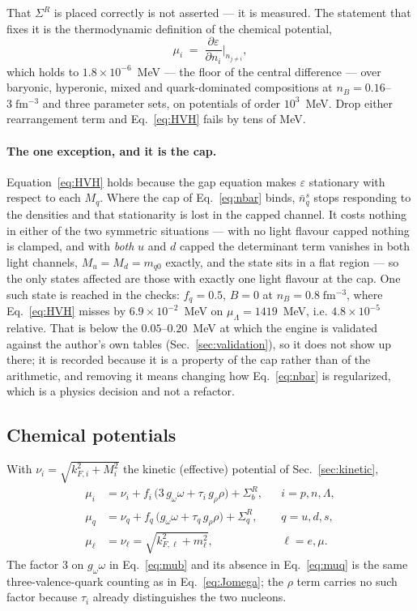 \documentclass[aps,prc,onecolumn,superscriptaddress,nofootinbib,10pt]{revtex4-2}
\newcommand{\nB}{n_B}
\newcommand{\nbs}{\bar{n}^s}
\newcommand{\SR}{\Sigma^{R}}
\begin{document}
That $\SR$ is placed correctly is not asserted --- it is measured. The
statement that fixes it is the thermodynamic definition of the chemical
potential,
%
\begin{equation}
\mu_i \;=\; \frac{\partial \varepsilon}{\partial n_i}
   \bigg|_{n_{j \ne i}} ,
\label{eq:HVH}
\end{equation}
%
which holds to $1.8\times10^{-6}$~MeV --- the floor of the central difference
--- over baryonic, hyperonic, mixed and quark-dominated compositions at
$\nB = 0.16$--$3\;\mathrm{fm^{-3}}$ and three parameter sets, on potentials of
order $10^3$~MeV. Drop either rearrangement term and Eq.~\eqref{eq:HVH} fails
by tens of MeV.

\paragraph{The one exception, and it is the cap.} Equation~\eqref{eq:HVH}
holds because the gap equation makes $\varepsilon$ stationary with respect to
each $M_q$. Where the cap of Eq.~\eqref{eq:nbar} binds, $\nbs_q$ stops
responding to the densities and that stationarity is lost in the capped
channel. It costs nothing in either of the two symmetric situations --- with
no light flavour capped nothing is clamped, and with \emph{both} $u$ and $d$
capped the determinant term vanishes in both light channels, $M_u = M_d =
m_{q0}$ exactly, and the state sits in a flat region --- so the only states
affected are those with exactly one light flavour at the cap. One such state
is reached in the checks: $f_q = 0.5$, $B = 0$ at
$\nB = 0.8\;\mathrm{fm^{-3}}$, where Eq.~\eqref{eq:HVH} misses by
$6.9\times10^{-2}$~MeV on $\mu_\Lambda = 1419$~MeV, i.e. $4.8\times10^{-5}$
relative. That is below the $0.05$--$0.20$~MeV at which the engine is
validated against the author's own tables
(Sec.~\ref{sec:validation}), so it does not show up there; it is recorded
because it is a property of the cap rather than of the arithmetic, and
removing it means changing how Eq.~\eqref{eq:nbar} is regularized, which is a
physics decision and not a refactor.

\subsection{Chemical potentials}

With $\nu_i = \sqrt{k_{F,i}^2 + M_i^2}$ the kinetic (effective) potential of
Sec.~\ref{sec:kinetic},
%
\begin{align}
\mu_i &= \nu_i + f_i\,\big(3\, g_\omega\omega + \tau_i\, g_\rho\rho\big)
         + \SR_b , &&i = p, n, \Lambda ,
\label{eq:mub}\\
\mu_q &= \nu_q + f_q\,\big(g_\omega\omega + \tau_q\, g_\rho\rho\big)
         + \SR_q , &&q = u, d, s ,
\label{eq:muq}\\
\mu_\ell &= \nu_\ell = \sqrt{k_{F,\ell}^2 + m_\ell^2} ,
         &&\ell = e, \mu .
\label{eq:mul}
\end{align}
%
The factor $3$ on $g_\omega\omega$ in Eq.~\eqref{eq:mub} and its absence in
Eq.~\eqref{eq:muq} is the same three-valence-quark counting as in
Eq.~\eqref{eq:Jomega}; the $\rho$ term carries no such factor because
$\tau_i$ already distinguishes the two nucleons.
\end{document}
